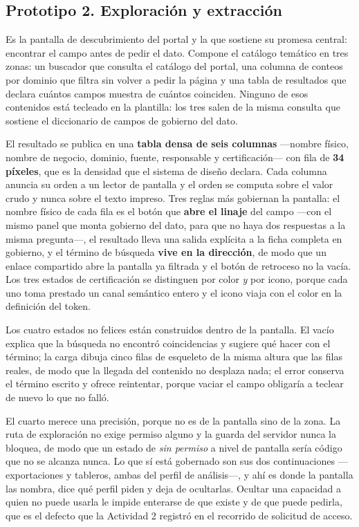 \clearpage
\subsection{Prototipo 2. Exploración y extracción}

Es la pantalla de descubrimiento del portal y la que sostiene su promesa central: encontrar el campo
antes de pedir el dato. Compone el catálogo temático en tres zonas: un buscador que consulta el
catálogo del portal, una columna de conteos por dominio que filtra sin volver a pedir la página y
una tabla de resultados que declara cuántos campos muestra de cuántos coinciden. Ninguno de esos
contenidos está tecleado en la plantilla: los tres salen de la misma consulta que sostiene el
diccionario de campos de gobierno del dato.

El resultado se publica en una \textbf{tabla densa de seis columnas} ---nombre físico, nombre de
negocio, dominio, fuente, responsable y certificación--- con fila de \textbf{34 píxeles}, que es la
densidad que el sistema de diseño declara. Cada columna anuncia su orden a un lector de pantalla y
el orden se computa sobre el valor crudo y nunca sobre el texto impreso. Tres reglas más gobiernan
la pantalla: el nombre físico de cada fila es el botón que \textbf{abre el linaje} del campo ---con
el mismo panel que monta gobierno del dato, para que no haya dos respuestas a la misma pregunta---,
el resultado lleva una salida explícita a la ficha completa en gobierno, y el término de búsqueda
\textbf{vive en la dirección}, de modo que un enlace compartido abre la pantalla ya filtrada y el
botón de retroceso no la vacía. Los tres estados de certificación se distinguen por color \emph{y}
por icono, porque cada uno toma prestado un canal semántico entero y el icono viaja con el color en
la definición del token.

Los cuatro estados no felices están construidos dentro de la pantalla. El vacío explica que la
búsqueda no encontró coincidencias y sugiere qué hacer con el término; la carga dibuja cinco filas
de esqueleto de la misma altura que las filas reales, de modo que la llegada del contenido no
desplaza nada; el error conserva el término escrito y ofrece reintentar, porque vaciar el campo
obligaría a teclear de nuevo lo que no falló.

El cuarto merece una precisión, porque no es de la pantalla sino de la zona. La ruta de exploración
no exige permiso alguno y la guarda del servidor nunca la bloquea, de modo que un estado de
\emph{sin permiso} a nivel de pantalla sería código que no se alcanza nunca. Lo que sí está
gobernado son sus dos continuaciones ---exportaciones y tableros, ambas del perfil de
análisis---, y ahí es donde la pantalla las nombra, dice qué perfil piden y deja de ocultarlas.
Ocultar una capacidad a quien no puede usarla le impide enterarse de que existe y de que puede
pedirla, que es el defecto que la Actividad 2 registró en el recorrido de solicitud de acceso.

